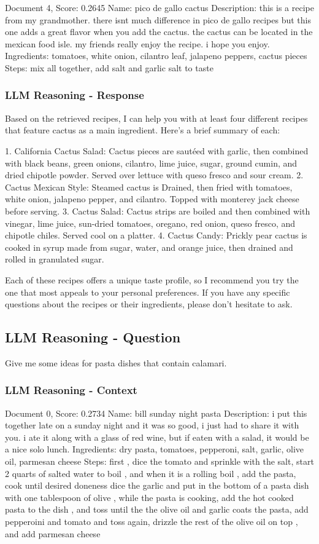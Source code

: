 \documentclass[a4paper,11pt]{article}
\begin{document}
Document 4, Score: 0.2645
Name: pico de gallo cactus
Description: this is a recipe from my grandmother. there isnt much difference in pico de gallo recipes but this one adds a great flavor when you add the cactus. the cactus can be located in the mexican food isle. my friends really enjoy the recipe. i hope you enjoy.
Ingredients: tomatoes, white onion, cilantro leaf, jalapeno peppers, cactus pieces
Steps: mix all together, add salt and garlic salt to taste


\subsubsection{LLM Reasoning - Response}
Based on the retrieved recipes, I can help you with at least four different recipes that feature cactus as a main ingredient. Here's a brief summary of each:

1. California Cactus Salad: Cactus pieces are sautéed with garlic, then combined with black beans, green onions, cilantro, lime juice, sugar, ground cumin, and dried chipotle powder. Served over lettuce with queso fresco and sour cream.
2. Cactus Mexican Style: Steamed cactus is Drained, then fried with tomatoes, white onion, jalapeno pepper, and cilantro. Topped with monterey jack cheese before serving.
3. Cactus Salad: Cactus strips are boiled and then combined with vinegar, lime juice, sun-dried tomatoes, oregano, red onion, queso fresco, and chipotle chiles. Served cool on a platter.
4. Cactus Candy: Prickly pear cactus is cooked in syrup made from sugar, water, and orange juice, then drained and rolled in granulated sugar.

Each of these recipes offers a unique taste profile, so I recommend you try the one that most appeals to your personal preferences. If you have any specific questions about the recipes or their ingredients, please don't hesitate to ask.


\subsection{LLM Reasoning - Question}
Give me some ideas for pasta dishes that contain calamari.

\subsubsection{LLM Reasoning - Context}
Document 0, Score: 0.2734
Name: bill sunday night pasta
Description: i put this together late on a sunday night and it was so good, i just had to share it with you. i ate it along with a glass of red wine, but if eaten with a salad, it would be a nice solo lunch.
Ingredients: dry pasta, tomatoes, pepperoni, salt, garlic, olive oil, parmesan cheese
Steps: first , dice the tomato and sprinkle with the salt, start 2 quarts of salted water to boil , and when it is a rolling boil , add the pasta, cook until desired doneness dice the garlic and put in the bottom of a pasta dish with one tablespoon of olive , while the pasta is cooking, add the hot cooked pasta to the dish , and toss until the the olive oil and garlic coats the pasta, add pepperoini and tomato and toss again, drizzle the rest of the olive oil on top , and add parmesan cheese
\end{document}
